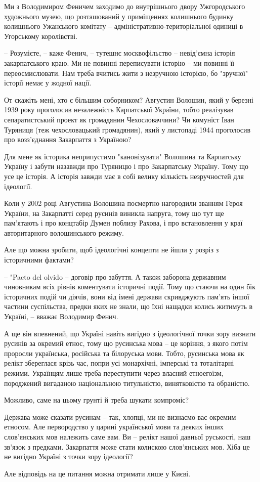 Ми з Володимиром Феничем заходимо до внутрішнього двору Ужгородського
художнього музею, що розташований у приміщеннях колишнього будинку колишнього
Ужанського комітату – адміністративно-територіальної одиниці в Угорському
королівстві.

– Розумієте, – каже Фенич, – тутешнє москвофільство – невід’ємна історія
закарпатського краю. Ми не повинні переписувати історію – ми повинні її
переосмислювати. Нам треба вчитись жити з незручною історією, бо "зручної"
історії немає у жодної нації.

От скажіть мені, хто є більшим соборником? Августин Волошин, який у березні
1939 року проголосив незалежність Карпатської України, тобто реалізував
сепаратистський проект як громадянин Чехословаччини? Чи комуніст Іван Туряниця
(теж чехословацький громадянин), який у листопаді 1944 проголосив про
возз’єднання Закарпаття з Україною?

Для мене як історика неприпустимо "канонізувати" Волошина та Карпатську Україну
і забути назавжди про Туряницю і про Закарпатську Україну. Тому що усе це
історія. А історія завжди має в собі велику кількість незручностей для
ідеології.

Коли у 2002 році Августина Волошина посмертно нагородили званням Героя України,
на Закарпатті серед русинів виникла напруга, тому що тут ще пам’ятають і про
концтабір Думен поблизу Рахова, і про встановлення у краї авторитарного
волошинського режиму.

Але що можна зробити, щоб ідеологічні концепти не йшли у розріз з історичними
фактами?

– "Pacto del olvido – договір про забуття. А також заборона державним
чиновникам всіх рівнів коментувати історичні події. Тому що стаючи на один бік
історичних подій чи діячів, вони від імені держави скривджують пам'ять іншої
частини суспільства, предки яких не знали, що їхні нащадки колись житимуть в
Україні, – вважає Володимир Фенич.

А ще він впевнений, що Україні навіть вигідно з ідеологічної точки зору визнати
русинів за окремий етнос, тому що русинська мова – це коріння, з якого потім
проросли українська, російська та білоруська мови. Тобто, русинська мова як
релікт збереглася крізь час, попри усі монархічні, імперські та тоталітарні
режими. Українцям лише треба переступити через власний етноегоїзм, породжений
вигаданою національною титульністю, винятковістю та обраністю.

Можливо, саме на цьому грунті й треба шукати компроміс?

Держава може сказати русинам – так, хлопці, ми не визнаємо вас окремим етносом.
Але первородство у царині української мови та деяких інших слов’янських мов
належить саме вам. Ви – релікт нашої давньої руськості, наш зв'язок з предками.
Закарпаття може стати колискою слов’янських мов. Хіба це не вигідно Україні з
точки зору ідеології?

Але відповідь на це питання можна отримати лише у Києві.

